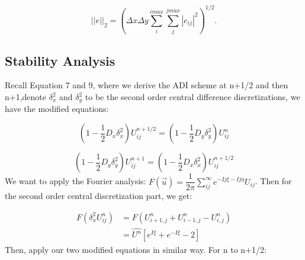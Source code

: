 \documentclass[12pt]{article}
\begin{document}
 	 \begin{equation}
 	 	||e||_2 = \left(\Delta x \Delta y\sum\limits_{i}^{imax}\sum_{j}^{jmax}|e_{ij}|^2\right)^{1/2}.  	 	
 	 \end{equation}	
 	 
 	 \subsection{Stability Analysis}
 	 Recall Equation 7 and 9, where we derive the ADI scheme at n+1/2 and then n+1,denote $\delta_x^2$ and $\delta_y^2$ to be the second order central difference discretizations, we have the modified equations: 
 	 
 	 \begin{equation}
 	 	(1-\dfrac{1}{2}D_x\delta_x^2)U_{ij}^{n+1/2} = (1-\dfrac{1}{2}D_y\delta_y^2)U_{ij}^{n}  
 	 \end{equation}
 	 
 	 \begin{equation}
 	 	(1-\dfrac{1}{2}D_y\delta_y^2)U_{ij}^{n+1} = (1-\dfrac{1}{2}D_x\delta_x^2)U_{ij}^{n+1/2}  
 	 \end{equation}
 	 We want to apply the Fourier analysis: $F(\vec{u}) = \dfrac{1}{2\pi}\sum\limits_{ij}^{\infty}e^{-Ij\xi-Ij\eta}U_{ij}$. Then for the second order central discretization part, we get: 
 	 
 	 \begin{align*}
 	 	F(\delta_x^2U_{ij}^n) &= F(U_{i+1,j}^n+U_{i-1,j}^n-U_{i,j}^n)\\
 	 	&=\hat{U^n}\left[e^{I\xi}+e^{-I\xi}-2\right]
 	 \end{align*}
 	 Then, apply our two modified equations in similar way. For n to n+1/2: 
 	 
\end{document}
